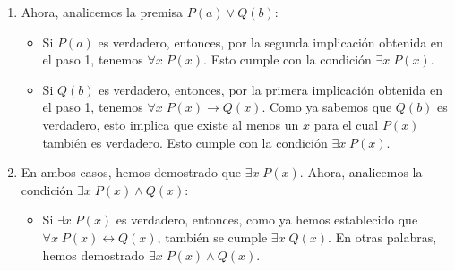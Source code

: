 \documentclass[12pt]{article}
\begin{document}
\begin{enumerate}[label=\color{red}\textbf{\arabic*)}, leftmargin=*]
\begin{enumerate}[label=\arabic*)]
      \item Ahora, analicemos la premisa $P(a) \vee Q(b)$:
        \begin{itemize}[label=$-$]
         \item  Si $P(a)$ es verdadero, entonces, por la segunda implicación obtenida en el paso 1, tenemos $\forall x\;P(x)$. Esto cumple con la condición $\exists x\;P(x)$.
         \item  Si $Q(b)$ es verdadero, entonces, por la primera implicación obtenida en el paso 1, tenemos $\forall x\;P(x) \longrightarrow Q(x)$. Como ya sabemos que $Q(b)$ es verdadero, esto implica que existe al menos un $x$ para el cual $P(x)$ también es verdadero. Esto cumple con la condición $\exists x\;P(x)$.
        \end{itemize}
      
      \item  En ambos casos, hemos demostrado que $\exists x\;P(x)$. Ahora, analicemos la condición $\exists x\;P(x) \wedge Q(x)$:
         \begin{itemize}[label=$-$]
         \item  Si $\exists x\;P(x)$ es verdadero, entonces, como ya hemos establecido que $\forall x\;P(x) \longleftrightarrow Q(x)$, también se cumple $\exists x\;Q(x)$. En otras palabras, hemos demostrado $\exists x\;P(x) \wedge Q(x)$.
         \end{itemize}
      \end{enumerate}
      

\end{enumerate}
\end{document}

